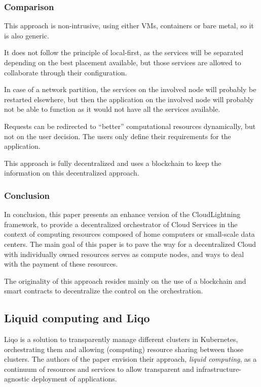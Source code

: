 \subsubsection*{Comparison}

This approach is non-intrusive, using either VMs, containers or bare
metal, so it is also generic.

It does not follow the principle of local-first, as the services will
be separated depending on the best placement available, but those
services are allowed to collaborate through their configuration.

In case of a network partition, the services on the involved node will
probably be restarted elsewhere, but then the application on the
involved node will probably not be able to function as it would not
have all the services available.

Requests can be redirected to ``better'' computational resources
dynamically, but not on the user decision.
%
The users only define their requirements for the application.

This approach is fully decentralized and uses a blockchain to keep the
information on this decentralized approach.



\subsubsection*{Conclusion}

In conclusion, this paper presents an enhance version of the
CloudLightning framework, to provide a decentralized orchestrator of
Cloud Services in the context of computing resources composed of home
computers or small-scale data centers.
%
The main goal of this paper is to pave the way for a decentralized
Cloud with individually owned resources serves as compute nodes, and
ways to deal with the payment of these resources.
%

The originality of this approach resides mainly on the use of a
blockchain and smart contracts to decentralize the control on the
orchestration.




\subsection{Liquid computing and Liqo~\cite{IRPCM22}}
\label{subsec:liqo}

Liqo is a solution to transparently manage different clusters in
Kubernetes, orchestrating them and allowing (computing) resource
sharing between those clusters.
%
The authors of the paper envision their approach, \emph{liquid
  computing}, as a continuum of resources and services to allow
transparent and infrastructure-agnostic deployment of applications.

